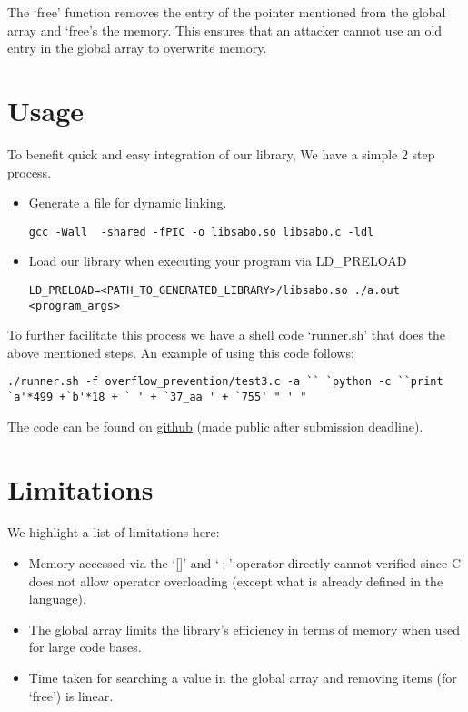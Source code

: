 \documentclass[a4paper, 11pt]{article}
\begin{document}
The `free' function removes the entry of the pointer mentioned from the global array and `free's the memory.  This ensures that an attacker cannot use an old entry in the global array to overwrite memory.

\section{Usage}

To benefit quick and easy integration of our library, We have a simple 2 step process.
\begin{itemize}
\item Generate a file for dynamic linking.
\lstset{language=bash}
\begin{lstlisting}
gcc -Wall  -shared -fPIC -o libsabo.so libsabo.c -ldl
\end{lstlisting}
\item Load our library when executing your program via LD\_PRELOAD
\begin{lstlisting}
LD_PRELOAD=<PATH_TO_GENERATED_LIBRARY>/libsabo.so ./a.out <program_args>
\end{lstlisting}
\end{itemize}

To further facilitate this process we have a shell code `runner.sh' that does the above mentioned steps.  An example of using this code follows:
\begin{lstlisting}[frame=single]
./runner.sh -f overflow_prevention/test3.c -a `` `python -c ``print
`a'*499 +`b'*18 + ` ' + `37_aa ' + `755' " ' "
\end{lstlisting}

The code can be found on \href{https://github.com/yugarsi/sabo}{github} (made public after submission deadline).

\section{Limitations}
We highlight a list of limitations here:
\begin{itemize}
\item Memory accessed via the `[]' and `+' operator directly cannot verified since C does not allow operator overloading (except what is already defined in the language).
\item The global array limits the library's efficiency in terms of memory when used for large code bases.
\item Time taken for searching a value in the global array and removing items (for `free') is linear.
\end{itemize}
\end{document}
